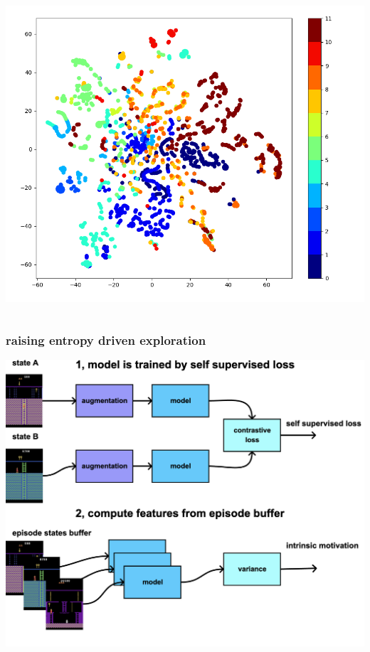 \documentclass{beamer}
\begin{document}
\begin{frame}
\begin{columns}
    \begin{column}{0.5\textwidth}
      \centering
      \includegraphics[scale=0.2]{../images/snd_features.png}
    \end{column}
  
  \end{columns}

\end{frame}


\begin{frame}
  
  \frametitle{raising entropy driven exploration }

  \centering
  \includegraphics[scale=0.15]{../diagrams/cnd/entropy.png}

\end{frame}
\end{document}
